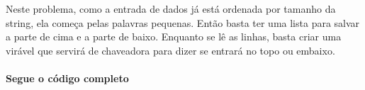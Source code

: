 Neste problema, como a entrada de dados já está ordenada por tamanho da string, ela começa pelas palavras pequenas. Então basta ter uma lista para salvar a parte de cima e a parte de baixo. Enquanto se lê as linhas, basta criar uma virável que servirá de chaveadora para dizer se entrará no topo ou embaixo.
\paragraph{Segue o código completo}
\begin{mdframed}[linewidth=0pt,backgroundcolor=codebgcolor]
    \inputminted[breaklines]{python}{../src/symmetricorder/symmetricorder.py}
\end{mdframed}